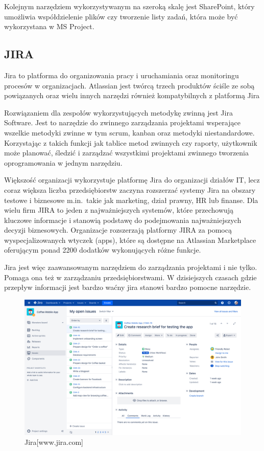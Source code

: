 Kolejnym narzędziem wykorzystywanym na szeroką skalę jest SharePoint,
który umożliwia współdzielenie plików czy tworzenie listy zadań,
która może być wykorzystana w MS Project.

\subsection{JIRA}

Jira to platforma do organizowania pracy i uruchamiania oraz monitoringu procesów w organizacjach.
Atlassian jest twórcą trzech produktów ściśle ze sobą powiązanych oraz wielu innych narzędzi również kompatybilnych z platformą Jira\cite{www_jira}

Rozwiązaniem dla zespołów wykorzystujących metodykę zwinną jest Jira Software.
Jest to narzędzie do zwinnego zarządzania projektami wsperające wszelkie metodyki zwinne w tym scrum,
kanban oraz metodyki niestandardowe.
Korzystając z takich funkcji jak tablice metod zwinnych czy raporty,
użytkownik może planować,
śledzić i zarządzać wszystkimi projektami zwinnego tworzenia oprogramowania w jednym narzędziu.~\cite{www_agile_jira}

Większość organizacji wykorzystuje platformę Jira do organizacji działów IT,
lecz coraz większa liczba przedsiębiorstw zaczyna rozszerzać systemy Jira
na obszary testowe i biznesowe m.in.\ takie jak marketing, dział prawny, HR lub finanse.
Dla wielu firm JIRA to jeden z najważniejszych systemów, które przechowują kluczowe informacje i
stanowią podstawę do podejmowania najważniejszych decyzji biznesowych.
Organizacje rozszerzają platformy JIRA za pomocą wyspecjalizowanych wtyczek (apps),
które są dostępne na Atlassian Marketplace oferującym ponad 2200 dodatków wykonujących różne funkcje.\cite{www_jira}

Jira jest więc zaawansowanym narzędziem do zarządzania projektami i nie tylko.
Pomaga ona też w zarządzaniu przedsiębiorstwami.
W dzisiejszych czasach gdzie przepływ informacji jest bardzo waćny jira stanowi bardzo pomocne narzędzie.

\begin{figure}[H]
	\centering\includegraphics[width=.8\textwidth]{img/jira}
	\caption{Jira[www.jira.com]}\label{rys:trello}%
\end{figure}

